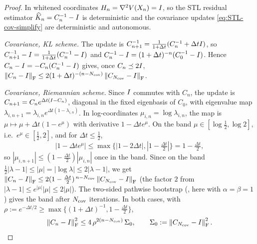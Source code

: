 \begin{proof}
In whitened coordinates $H_n=\nabla^2V(X_n)=I$, so the STL residual estimator
$\widehat K_n=C_n^{-1}-I$ is deterministic and the covariance updates
\eqref{eq:STL-cov-simplify} are deterministic and autonomous.

\emph{Covariance, KL scheme.} The update is $C_{n+1}^{-1}=\tfrac1{1+\Delta t}(C_n^{-1}+\Delta tI)$,
so $C_{n+1}^{-1}-I=\tfrac1{1+\Delta t}(C_n^{-1}-I)$ and
$C_n^{-1}-I=(1+\Delta t)^{-n}(C_0^{-1}-I)$. Hence
$C_n-I=-C_n(C_n^{-1}-I)$ gives, once $C_n\preceq2I$,
$\left\lVert C_n-I\right\rVert_{\mathrm{F}}\leq2(1+\Delta t)^{-(n-N_{\mathrm{cov}})}\left\lVert C_{N_{\mathrm{cov}}}-I\right\rVert_{\mathrm{F}}$.

\emph{Covariance, Riemannian scheme.} Since $I$ commutes with $C_n$, the update is
$C_{n+1}=C_ne^{\Delta t(I-C_n)}$, diagonal in the fixed eigenbasis of $C_0$, with
eigenvalue map $\lambda_{i,n+1}=\lambda_{i,n}e^{\Delta t(1-\lambda_{i,n})}$. In
log-coordinates $\mu_{i,n}=\log\lambda_{i,n}$, the map is
$\mu\mapsto\mu+\Delta t(1-e^\mu)$ with derivative $1-\Delta t e^\mu$. On the band
$\mu\in[\log\tfrac12,\log2]$, i.e.\ $e^\mu\in[\tfrac12,2]$, and for $\Delta t\leq\tfrac12$,
\[
    |1-\Delta t e^\mu|
    \leq
    \max\{|1-2\Delta t|,|1-\tfrac{\Delta t}2|\}
    =
    1-\tfrac{\Delta t}2 ,
\]
so $|\mu_{i,n+1}|\leq(1-\tfrac{\Delta t}2)|\mu_{i,n}|$ once in the band. Since on the band
$\tfrac12|\lambda-1|\leq|\mu|=|\log\lambda|\leq2|\lambda-1|$, we get
$\left\lVert C_n-I\right\rVert_{\mathrm{F}}\leq2(1-\tfrac{\Delta t}2)^{\,n-N_{\mathrm{cov}}}\left\lVert C_{N_{\mathrm{cov}}}-I\right\rVert_{\mathrm{F}}$
(the factor $2$ from $|\lambda-1|\le e^{|\mu|}|\mu|\le 2|\mu|$). The two-sided pathwise
bootstrap (, here with $\alpha=\beta=1$) gives the band after
$N_{\mathrm{cov}}$ iterations. In both cases, with $\rho:=e^{-\Delta t/2}\geq\max\{(1+\Delta t)^{-1},1-\tfrac{\Delta t}2\}$,
\begin{equation}
\label{eq:Gauss-cov-decay}
    \left\lVert C_n-I\right\rVert_{\mathrm{F}}^2
    \leq
    4\,\rho^{2(n-N_{\mathrm{cov}})}\,\Sigma_0,
    \qquad
    \Sigma_0:=\left\lVert C_{N_{\mathrm{cov}}}-I\right\rVert_{\mathrm{F}}^2 .
\end{equation}


\end{proof}
